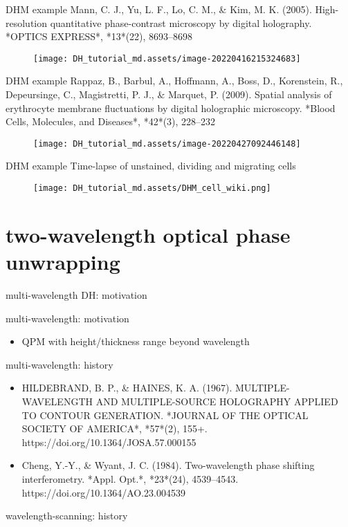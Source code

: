 \documentclass[t, aspectratio=169]{beamer}
\begin{document}
\begin{frame}{DHM example}
Mann, C. J., Yu, L. F., Lo, C. M., \& Kim, M. K. (2005). High-resolution quantitative phase-contrast microscopy by digital holography. *OPTICS EXPRESS*, *13*(22), 8693–8698
	\begin{figure}
		\texttt{[image: DH\_tutorial\_md.assets/image-20220416215324683]}
	\end{figure}
\end{frame}


\begin{frame}{DHM example}
Rappaz, B., Barbul, A., Hoffmann, A., Boss, D., Korenstein, R., Depeursinge, C., Magistretti, P. J., \& Marquet, P. (2009). Spatial analysis of erythrocyte membrane fluctuations by digital holographic microscopy. *Blood Cells, Molecules, and Diseases*, *42*(3), 228–232
	\begin{figure}
		\texttt{[image: DH\_tutorial\_md.assets/image-20220427092446148]}
	\end{figure}
\end{frame}


\begin{frame}{DHM example}
Time-lapse of unstained, dividing and migrating cells
	\begin{figure}
		\texttt{[image: DH\_tutorial\_md.assets/DHM\_cell\_wiki.png]}
	\end{figure}
\end{frame}


\section{two-wavelength optical phase unwrapping}
\begin{frame}[c]
\centering\LARGE\textbf{\secname}
\end{frame}


\begin{frame}{multi-wavelength DH: motivation}

	multi-wavelength: motivation
	\begin{itemize}
		\item QPM with height/thickness range beyond wavelength
	\end{itemize}
	
	multi-wavelength: history
	\begin{itemize}
		\item HILDEBRAND, B. P., \& HAINES, K. A. (1967). MULTIPLE-WAVELENGTH AND MULTIPLE-SOURCE HOLOGRAPHY APPLIED TO CONTOUR GENERATION. *JOURNAL OF THE OPTICAL SOCIETY OF AMERICA*, *57*(2), 155+. https://doi.org/10.1364/JOSA.57.000155
		\item Cheng, Y.-Y., \& Wyant, J. C. (1984). Two-wavelength phase shifting interferometry. *Appl. Opt.*, *23*(24), 4539–4543. https://doi.org/10.1364/AO.23.004539
	\end{itemize}
	
	wavelength-scanning: history

\end{frame}
\end{document}
